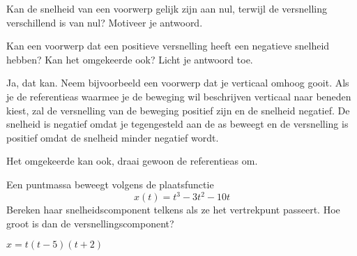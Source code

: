 \documentclass{ximera}
\begin{document}
	\author{Bart Lambregs}
    \xmsource\xmuitleg




\begin{exercise}
Kan de snelheid van een voorwerp gelijk zijn aan nul, terwijl de versnelling verschillend is van nul? Motiveer je antwoord.
\end{exercise}


\begin{exercise}
Kan een voorwerp dat een positieve versnelling heeft een negatieve snelheid hebben? Kan het omgekeerde ook? Licht je antwoord toe.

\begin{oplossing}
    Ja, dat kan. Neem bijvoorbeeld een voorwerp dat je verticaal omhoog gooit. Als je de referentieas waarmee je de beweging wil beschrijven verticaal naar beneden kiest, zal de versnelling van de beweging positief zijn en de snelheid negatief. De snelheid is negatief omdat je tegengesteld aan de as beweegt en de versnelling is positief omdat de snelheid minder negatief wordt.

    Het omgekeerde kan ook, draai gewoon de referentieas om.
\end{oplossing}
\end{exercise}

\begin{exercise}
	Een puntmassa beweegt volgens de plaatsfunctie
	\[
	x(t)=t^3-3t^2-10t
	\]
	Bereken haar snelheidscomponent telkens als ze het vertrekpunt passeert. Hoe groot is dan de versnellingscomponent?
	\begin{oplossing}
		$x=t(t-5)(t+2)$
	\end{oplossing}
\end{exercise}
\end{document}
